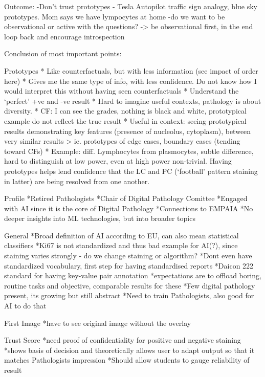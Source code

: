 Outcome: 
-Don't trust prototypes - Tesla Autopilot traffic sign analogy, blue sky prototypes. Mom says we have lympocytes at home
-do we want to be observational or active with the questions? -> be observational first, in the end loop back and encourage introspection

Conclusion of most important points:

Prototypes
* Like counterfactuals, but with less information (see impact of order here)
* Gives me the same type of info, with less confidence. Do not know how I would interpret this without having seen counterfactuals
* Understand the ‘perfect’ +ve and -ve result
* Hard to imagine useful contexts, pathology is about diversity.
* CF: I can see the grades, nothing is black and white, prototypical example do not reflect the true result
* Useful in context: seeing prototypical results demonstrating key features (presence of nucleolus, cytoplasm), between very similar results > ie. prototypes of edge cases, boundary cases (tending toward CFs)
* Example: diff. Lymphocytes from plasmocytes, subtle difference, hard to distinguish at low power, even at high power non-trivial. Having prototypes helps lend confidence that the LC and PC (‘football’ pattern staining in latter) are being resolved from one another.

Profile
*Retired Pathologists
*Chair of Digital Pathology Comittee
*Engaged with AI since it is the core of Digital Pathology
*Connections to EMPAIA
*No deeper insights into ML technologies, but into broader topics

General
*Broad definition of AI according to EU, can also mean statistical classifiers
*Ki67 is not standardized and thus bad example for AI(?), since staining varies strongly - do we change staining or algorithm?
*Dont even have standardized vocabulary, first step for having standardised reports
*Daicon 222 standard for having key-value pair annotation
*expectations are to offload boring, routine tasks and objective, comparable results for these
*Few digital pathology present, its growing but still abstract
*Need to train Pathologists, also good for AI to do that

First Image
*have to see original image without the overlay

Trust Score
*need proof of confidentiality for positive and negative staining
*shows basis of decision and theoretically allows user to adapt output so that it matches Pathologists impression
*Should allow students to gauge reliability of result


